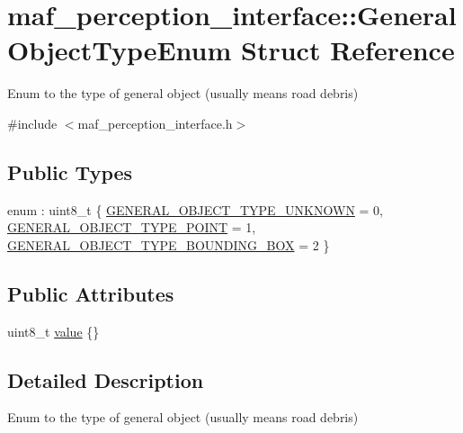 \hypertarget{structmaf__perception__interface_1_1GeneralObjectTypeEnum}{}\section{maf\+\_\+perception\+\_\+interface\+:\+:General\+Object\+Type\+Enum Struct Reference}
\label{structmaf__perception__interface_1_1GeneralObjectTypeEnum}


Enum to the type of general object (usually means road debris)  




{\ttfamily \#include $<$maf\+\_\+perception\+\_\+interface.\+h$>$}

\subsection*{Public Types}
\begin{DoxyCompactItemize}
\item 
enum \+: uint8\+\_\+t \{ \hyperlink{structmaf__perception__interface_1_1GeneralObjectTypeEnum_a557ac1d9279ccbe49c72b86a04ca1a2ba9a5d182ea09d1f94b1ce9399953a41d2}{G\+E\+N\+E\+R\+A\+L\+\_\+\+O\+B\+J\+E\+C\+T\+\_\+\+T\+Y\+P\+E\+\_\+\+U\+N\+K\+N\+O\+WN} = 0, 
\hyperlink{structmaf__perception__interface_1_1GeneralObjectTypeEnum_a557ac1d9279ccbe49c72b86a04ca1a2baf793104ee417849e6d09fdba1f562014}{G\+E\+N\+E\+R\+A\+L\+\_\+\+O\+B\+J\+E\+C\+T\+\_\+\+T\+Y\+P\+E\+\_\+\+P\+O\+I\+NT} = 1, 
\hyperlink{structmaf__perception__interface_1_1GeneralObjectTypeEnum_a557ac1d9279ccbe49c72b86a04ca1a2ba7d176b99ce818eb5bd41ef316ac53ffe}{G\+E\+N\+E\+R\+A\+L\+\_\+\+O\+B\+J\+E\+C\+T\+\_\+\+T\+Y\+P\+E\+\_\+\+B\+O\+U\+N\+D\+I\+N\+G\+\_\+\+B\+OX} = 2
 \}
\end{DoxyCompactItemize}
\subsection*{Public Attributes}
\begin{DoxyCompactItemize}
\item 
uint8\+\_\+t \hyperlink{structmaf__perception__interface_1_1GeneralObjectTypeEnum_afa784a7b3f6d831f8086ae2be1630f11}{value} \{\}
\end{DoxyCompactItemize}


\subsection{Detailed Description}
Enum to the type of general object (usually means road debris) 

